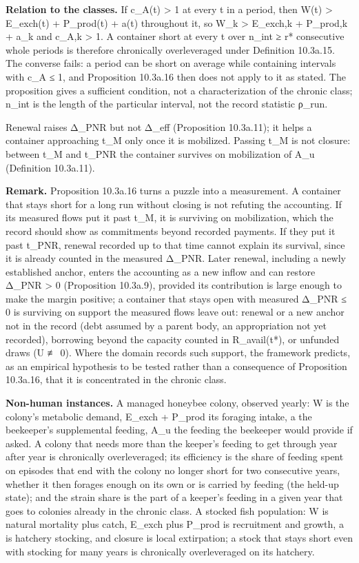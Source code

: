\documentclass[
]{article}
\begin{document}
\textbf{Relation to the classes.} If c\_A(t) \textgreater{} 1 at every t
in a period, then W(t) \textgreater{} E\_exch(t) + P\_prod(t) + a(t)
throughout it, so W\_k \textgreater{} E\_exch,k + P\_prod,k + a\_k and
c\_A,k \textgreater{} 1. A container short at every t over n\_int ≥ r*
consecutive whole periods is therefore chronically overleveraged under
Definition 10.3a.15. The converse fails: a period can be short on
average while containing intervals with c\_A ≤ 1, and Proposition
10.3a.16 then does not apply to it as stated. The proposition gives a
sufficient condition, not a characterization of the chronic class;
n\_int is the length of the particular interval, not the record
statistic ρ\_run.

Renewal raises Δ\_PNR but not Δ\_eff (Proposition 10.3a.11); it helps a
container approaching t\_M only once it is mobilized. Passing t\_M is
not closure: between t\_M and t\_PNR the container survives on
mobilization of A\_u (Definition 10.3a.11).

\textbf{Remark.} Proposition 10.3a.16 turns a puzzle into a measurement.
A container that stays short for a long run without closing is not
refuting the accounting. If its measured flows put it past t\_M, it is
surviving on mobilization, which the record should show as commitments
beyond recorded payments. If they put it past t\_PNR, renewal recorded
up to that time cannot explain its survival, since it is already counted
in the measured Δ\_PNR. Later renewal, including a newly established
anchor, enters the accounting as a new inflow and can restore Δ\_PNR
\textgreater{} 0 (Proposition 10.3a.9), provided its contribution is
large enough to make the margin positive; a container that stays open
with measured Δ\_PNR ≤ 0 is surviving on support the measured flows
leave out: renewal or a new anchor not in the record (debt assumed by a
parent body, an appropriation not yet recorded), borrowing beyond the
capacity counted in R\_avail(t*), or unfunded draws (U ≢ 0). Where the
domain records such support, the framework predicts, as an empirical
hypothesis to be tested rather than a consequence of Proposition
10.3a.16, that it is concentrated in the chronic class.

\textbf{Non-human instances.} A managed honeybee colony, observed
yearly: W is the colony's metabolic demand, E\_exch + P\_prod its
foraging intake, a the beekeeper's supplemental feeding, A\_u the
feeding the beekeeper would provide if asked. A colony that needs more
than the keeper's feeding to get through year after year is chronically
overleveraged; its efficiency is the share of feeding spent on episodes
that end with the colony no longer short for two consecutive years,
whether it then forages enough on its own or is carried by feeding (the
held-up state); and the strain share is the part of a keeper's feeding
in a given year that goes to colonies already in the chronic class. A
stocked fish population: W is natural mortality plus catch, E\_exch plus
P\_prod is recruitment and growth, a is hatchery stocking, and closure
is local extirpation; a stock that stays short even with stocking for
many years is chronically overleveraged on its hatchery.
\end{document}
